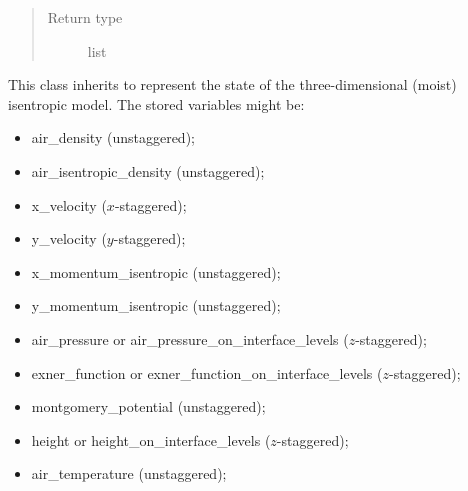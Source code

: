 \documentclass[letterpaper,10pt,english]{sphinxmanual}
\begin{document}
\begin{fulllineitems}
\begin{fulllineitems}
\begin{quote}
\begin{description}
\item[{Return type}] \leavevmode
list

\end{description}\end{quote}

\end{fulllineitems}


\end{fulllineitems}


\begin{fulllineitems}
\label{\detokenize{api:storages.state_isentropic.StateIsentropic}}
This class inherits {\hyperref[\detokenize{api:storages.grid_data.GridData}]{}} to represent the state of the three-dimensional
(moist) isentropic model. The stored variables might be:
\begin{itemize}
\item {} 
air\_density (unstaggered);

\item {} 
air\_isentropic\_density (unstaggered);

\item {} 
x\_velocity (\(x\)-staggered);

\item {} 
y\_velocity (\(y\)-staggered);

\item {} 
x\_momentum\_isentropic (unstaggered);

\item {} 
y\_momentum\_isentropic (unstaggered);

\item {} 
air\_pressure or air\_pressure\_on\_interface\_levels (\(z\)-staggered);

\item {} 
exner\_function or exner\_function\_on\_interface\_levels (\(z\)-staggered);

\item {} 
montgomery\_potential (unstaggered);

\item {} 
height or height\_on\_interface\_levels (\(z\)-staggered);

\item {} 
air\_temperature (unstaggered);


\end{itemize}
\end{fulllineitems}
\end{document}
